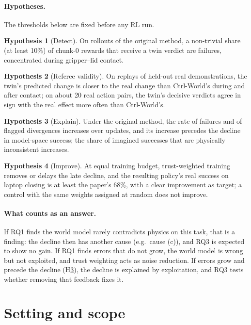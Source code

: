\documentclass[11pt,a4paper]{article}
\theoremstyle{plain}
\theoremstyle{definition}
\newtheorem{hypothesis}{Hypothesis}
\theoremstyle{remark}
\begin{document}
\paragraph{Hypotheses.} The thresholds below are fixed before any RL run.
\begin{hypothesis}[Detect]\label{h:detect}
On rollouts of the original method, a non-trivial share (at least 10\%) of chunk-0 rewards that receive a twin verdict are failures, concentrated during gripper--lid contact.
\end{hypothesis}
\begin{hypothesis}[Referee validity]\label{h:valid}
On replays of held-out real demonstrations, the twin's predicted change is closer to the real change than Ctrl-World's during and after contact; on about 20 real action pairs, the twin's decisive verdicts agree in sign with the real effect more often than Ctrl-World's.
\end{hypothesis}
\begin{hypothesis}[Explain]\label{h:explain}
Under the original method, the rate of failures and of flagged divergences increases over updates, and its increase precedes the decline in model-space success; the share of imagined successes that are physically inconsistent increases.
\end{hypothesis}
\begin{hypothesis}[Improve]\label{h:improve}
At equal training budget, trust-weighted training removes or delays the late decline, and the resulting policy's real success on laptop closing is at least the paper's 68\%, with a clear improvement as target; a control with the same weights assigned at random does not improve.
\end{hypothesis}

\paragraph{What counts as an answer.} If RQ1 finds the world model rarely contradicts physics on this task, that is a finding: the decline then has another cause (e.g.\ cause (c)), and RQ3 is expected to show no gain. If RQ1 finds errors that do not grow, the world model is wrong but not exploited, and trust weighting acts as noise reduction. If errors grow and precede the decline (H\ref{h:explain}), the decline is explained by exploitation, and RQ3 tests whether removing that feedback fixes it.

\section{Setting and scope}\label{sec:scope}
\end{document}
